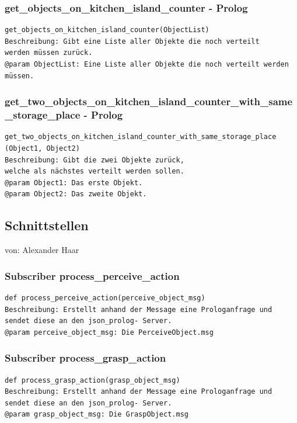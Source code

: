 \documentclass{suturo}
\makeatletter
\newcommand{\chapterauthor}[1]{%
  {\parindent0pt\vspace*{-27pt}%
  \linespread{0}\small\begin{flushright}von: #1\end{flushright}%
  \par\nobreak\vspace*{0pt}}
  \@afterheading%
}
\makeatother
\begin{document}
\subsubsection{get\_objects\_on\_kitchen\_island\_counter - Prolog}
\begin{verbatim}
get_objects_on_kitchen_island_counter(ObjectList)
Beschreibung: Gibt eine Liste aller Objekte die noch verteilt
werden müssen zurück.
@param ObjectList: Eine Liste aller Objekte die noch verteilt werden müssen.
\end{verbatim}

\subsubsection{get\_two\_objects\_on\_kitchen\_island\_counter\_with\_same\_storage\_place - Prolog}
\begin{verbatim}
get_two_objects_on_kitchen_island_counter_with_same_storage_place
(Object1, Object2)
Beschreibung: Gibt die zwei Objekte zurück, 
welche als nächstes verteilt werden sollen.
@param Object1: Das erste Objekt.
@param Object2: Das zweite Objekt.
\end{verbatim}

\subsection{Schnittstellen}
\chapterauthor{Alexander Haar}

\subsubsection{Subscriber process\_perceive\_action}
\begin{verbatim}
def process_perceive_action(perceive_object_msg)
Beschreibung: Erstellt anhand der Message eine Prologanfrage und
sendet diese an den json_prolog- Server. 
@param perceive_object_msg: Die PerceiveObject.msg
\end{verbatim}

\subsubsection{Subscriber process\_grasp\_action}
\begin{verbatim}
def process_grasp_action(grasp_object_msg)
Beschreibung: Erstellt anhand der Message eine Prologanfrage und
sendet diese an den json_prolog- Server. 
@param grasp_object_msg: Die GraspObject.msg
\end{verbatim}
\end{document}
